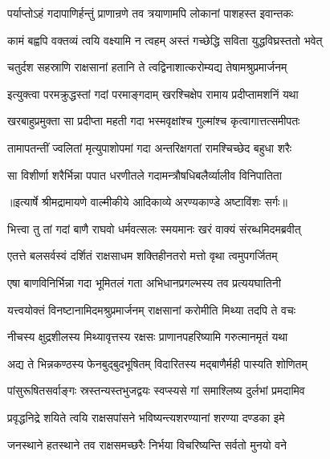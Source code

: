 \twolineshloka
{पर्याप्तोऽहं गदापाणिर्हन्तुं प्राणान्रणे तव}
{त्रयाणामपि लोकानां पाशहस्त इवान्तकः} %

\twolineshloka
{कामं बह्वपि वक्तव्यं त्वयि वक्ष्यामि न त्वहम्}
{अस्तं गच्छेद्धि सविता युद्धविघ्रस्ततो भवेत्} %

\twolineshloka
{चतुर्दश सहस्राणि राक्षसानां हतानि ते}
{त्वद्विनाशात्करोम्यद्य तेषामश्रुप्रमार्जनम्} %

\twolineshloka
{इत्युक्त्वा परमक्रुद्धस्तां गदां परमाङ्गदाम्}
{खरश्चिक्षेप रामाय प्रदीप्तामशनिं यथा} %

\twolineshloka
{खरबाहुप्रमुक्ता सा प्रदीप्ता महती गदा}
{भस्मवृक्षांश्च गुल्मांश्च कृत्वागात्तत्समीपतः} %

\twolineshloka
{तामापतन्तीं ज्वलितां मृत्युपाशोपमां गदा}
{अन्तरिक्षगतां रामश्चिच्छेद बहुधा शरैः} %

\twolineshloka
{सा विशीर्णा शरैर्भिन्ना पपात धरणीतले}
{गदामन्त्रौषधिबलैर्व्यालीव विनिपातिता} %


{॥इत्यार्षे श्रीमद्रामायणे वाल्मीकीये आदिकाव्ये अरण्यकाण्डे अष्टाविंशः सर्गः॥}


\twolineshloka
{भित्त्वा तु तां गदां बाणै राघवो धर्मवत्सलः}
{स्मयमानः खरं वाक्यं संरब्धमिदमब्रवीत्} %

\twolineshloka
{एतत्ते बलसर्वस्वं दर्शितं राक्षसाधम}
{शक्तिहीनतरो मत्तो वृथा त्वमुपगर्जितम्} %

\twolineshloka
{एषा बाणविनिर्भिन्ना गदा भूमितलं गता}
{अभिधानप्रगल्भस्य तव प्रत्ययघातिनी} %

\twolineshloka
{यत्त्वयोक्तं विनष्टानामिदमश्रुप्रमार्जनम्}
{राक्षसानां करोमीति मिथ्या तदपि ते वचः} %

\twolineshloka
{नीचस्य क्षुद्रशीलस्य मिथ्यावृत्तस्य रक्षसः}
{प्राणानपहरिष्यामि गरुत्मानमृतं यथा} %

\twolineshloka
{अद्य ते भिन्नकण्ठस्य फेनबुद्बुदभूषितम्}
{विदारितस्य मद्बाणैर्मही पास्यति शोणितम्} %

\twolineshloka
{पांसुरूषितसर्वाङ्गः स्रस्तन्यस्तभुजद्वयः}
{स्वप्स्यसे गां समाश्लिष्य दुर्लभां प्रमदामिव} %

\twolineshloka
{प्रवृद्धनिद्रे शयिते त्वयि राक्षसपांसने}
{भविष्यन्त्यशरण्यानां शरण्या दण्डका इमे} %

\twolineshloka
{जनस्थाने हतस्थाने तव राक्षसमच्छरैः}
{निर्भया विचरिष्यन्ति सर्वतो मुनयो वने} %

